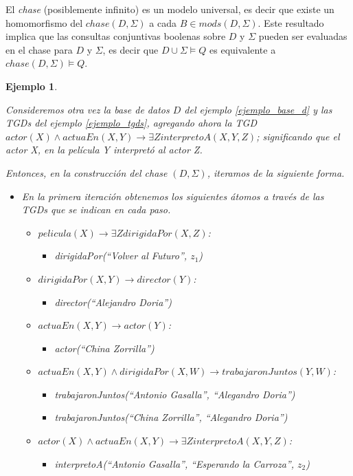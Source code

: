 \documentclass[11pt,a4paper,twoside]{tesis}
\newtheorem{exmp}{Ejemplo}
\begin{document}
El \textit{chase} (posiblemente infinito) es un modelo universal, es decir que existe un homomorfismo del $chase(D, \Sigma)$ a cada $B \in mods(D,\Sigma)$. Este resultado implica que las consultas conjuntivas boolenas sobre $D$ y $\Sigma$ pueden ser evaluadas en el chase para $D$ y $\Sigma$, es decir que $D \cup \Sigma \models Q$ es equivalente a $chase(D, \Sigma) \models Q$. 


\begin{exmp}\label{ejemplo_chase}

    Consideremos otra vez la base de datos $D$ del ejemplo \ref{ejemplo_base_d} y las TGDs del ejemplo \ref{ejemplo_tgds}, agregando ahora la TGD $actor(X) \land actuaEn(X, Y) \rightarrow \exists Z interpretoA(X, Y, Z)$; significando que el actor X, en la película Y interpretó al actor Z. 
    
    Entonces, en la construcción del chase $(D, \Sigma)$, iteramos de la siguiente forma.
    
    \begin{itemize}
        \item En la primera iteración obtenemos los siguientes átomos a través de las TGDs que se indican en cada paso.
        \begin{itemize}
            \item $pelicula(X) \rightarrow \exists Z dirigidaPor(X, Z)$:
            \begin{itemize}
                \item \textit{dirigidaPor(``Volver al Futuro'', $z_1$)}
            \end{itemize}
            \item $dirigidaPor(X, Y) \rightarrow director(Y)$:
            \begin{itemize}
                \item  \textit{director(``Alejandro Doria'')}
            \end{itemize}
            \item $actuaEn(X, Y) \rightarrow actor(Y)$:
            \begin{itemize}
                \item  \textit{actor(``China Zorrilla'')}
            \end{itemize}
            \item $actuaEn(X, Y) \land dirigidaPor(X, W) \rightarrow trabajaronJuntos(Y, W) $:
            \begin{itemize}
                \item  \textit{trabajaronJuntos(``Antonio Gasalla'', ``Alegandro Doria'')}
                \item  \textit{trabajaronJuntos(``China Zorrilla'', ``Alegandro Doria'')}
            \end{itemize}            
            \item $actor(X) \land actuaEn(X, Y) \rightarrow \exists Z interpretoA(X, Y, Z)$:
            \begin{itemize}
                \item  \textit{interpretoA(``Antonio Gasalla'', ``Esperando la Carroza'', $z_2$)}
            \end{itemize}
        \end{itemize}


\end{itemize}
\end{exmp}
\end{document}
